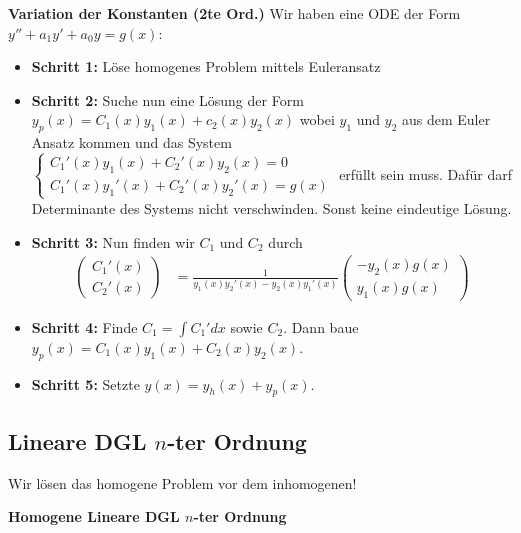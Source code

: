 \documentclass[25pt]{sciposter}
\newenvironment{method}[1]{\begin{mdframed}[backgroundcolor=blue!10,innertopmargin=15pt, innerbottommargin=15pt, nobreak=true]
		\textbf{#1 }
	}
	{ 
	\end{mdframed}
}
\begin{document}
\begin{multicols}{3}
\begin{method}{Variation der Konstanten (2te Ord.)} Wir haben eine ODE der Form $y'' + a_1 y' + a_0 y = g(x)$:
	\begin{itemize}
		\item \textbf{Schritt 1: } Löse homogenes Problem mittels Euleransatz
		\item \textbf{Schritt 2: } Suche nun eine Lösung der Form $y_p(x) = C_1 (x)y_1 (x) +c_2(x)y_2(x)$ wobei $y_1$ und $y_2$ aus dem Euler Ansatz kommen und das System  $\left\{
		\begin{array}{ll}
		C_1'(x) y_1(x) + C_2'(x)y_2(x) = 0 \\
		C_1'(x) y_1'(x) + C_2'(x)y_2'(x) = g(x)
		\end{array}
		\right.$ erfüllt sein muss. Dafür darf Determinante des Systems nicht verschwinden. Sonst keine eindeutige Lösung.
		\item \textbf{Schritt 3: } Nun finden wir $C_1$ und $C_2$ durch 
		\begin{align*}
			\begin{pmatrix}
			C_1'(x)\\C_2'(x)
			\end{pmatrix} &= \frac{1}{y_1(x) y_2'(x) - y_2(x) y_1'(x)} 	\begin{pmatrix}
			-y_2(x) g(x)\\ y_1(x) g(x)
			\end{pmatrix} 
		\end{align*}
		\item \textbf{Schritt 4: } Finde $C_1 = \int C_1' dx$ sowie $C_2$. Dann baue $y_p(x) = C_1 (x)y_1 (x) +C_2(x)y_2(x)$.
		\item \textbf{Schritt 5: } Setzte $y(x) = y_h(x) + y_p(x)$.
	\end{itemize}
	
\end{method}


\subsection*{Lineare DGL $n$-ter Ordnung}

Wir lösen das homogene Problem vor dem inhomogenen!

\begin{method}{Homogene Lineare DGL $n$-ter Ordnung}


\end{method}
\end{multicols}
\end{document}
